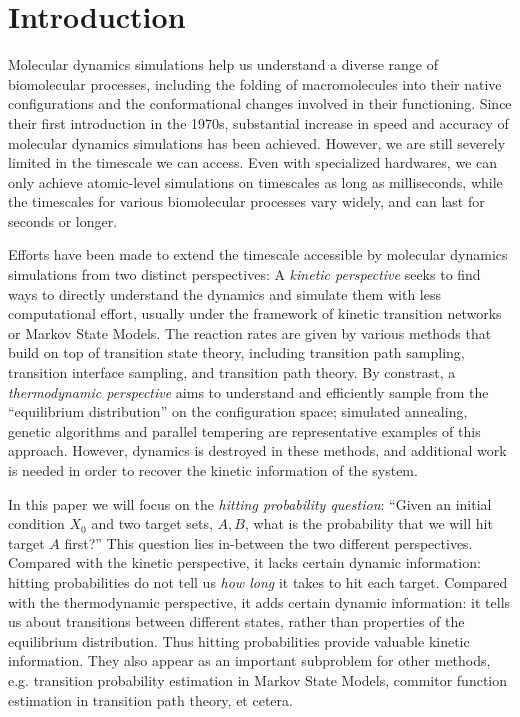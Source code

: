 \documentclass[english, aip, jcp, priprint, graphicx,floatfix]{revtex4-1}
\theoremstyle{plain}
\theoremstyle{definition}
\theoremstyle{plain}
\begin{document}
\section{Introduction}

Molecular dynamics simulations help us understand a diverse range of biomolecular processes, including the folding of macromolecules into their native configurations\cite{Scheraga2007-qw} and the conformational changes involved in their functioning.\cite{Hospital2015-ol} Since their first introduction in the 1970s,\cite{McCammon1977-kg, Warshel1976-qg} substantial increase in speed and accuracy of molecular dynamics simulations has been achieved. However, we are still severely limited in the timescale we can access. Even with specialized hardwares, we can only achieve atomic-level simulations on timescales as long as milliseconds,\cite{Dror2012-ws} while the timescales for various biomolecular processes vary widely, and can last for seconds or longer.\cite{Naganathan2005-ki, Zemora2010-lb} 

Efforts have been made to extend the timescale accessible by molecular dynamics simulations from two distinct perspectives: A \emph{kinetic perspective} seeks to find ways to directly understand the dynamics and simulate them with less computational effort, usually under the framework of kinetic transition networks\cite{Noe2006-cs, Wales2006-ur} or Markov State Models\cite{Pande2010-yi, Chodera2014-bh, Husic2018-xp}. The reaction rates are given by various methods that build on top of transition state theory\cite{Eyring1935-ur, Chandler1978-bq, Wigner1997-kk}, including transition path sampling\cite{Dellago1998-lb, Bolhuis2002-ws}, transition interface sampling\cite{Van_Erp2005-vw}, and transition path theory\cite{E2006-fm, E2010-sr}. By constrast, a \emph{thermodynamic perspective} aims to understand and efficiently sample from the ``equilibrium distribution'' on the configuration space; simulated annealing,\cite{Kirkpatrick1983-su} genetic algorithms\cite{Goldberg1989-ko} and parallel tempering\cite{Sugita1999-vh} are representative examples of this approach. However, dynamics is destroyed in these methods, and additional work\cite{Yang2007-gn, Andrec2005-fh, Zheng2009-ow, Huang2010-uu} is needed in order to recover the kinetic information of the system.

In this paper we will focus on the \emph{hitting probability question}: ``Given an initial condition $X_0$ and two target sets, $A,B$, what is the probability that we will hit target $A$ first?'' This question lies in-between the two different perspectives. Compared with the kinetic perspective, it lacks certain dynamic information: hitting probabilities do not tell us \emph{how long} it takes to hit each target.  Compared with the thermodynamic perspective, it adds certain dynamic information: it tells us about transitions between different states, rather than properties of the equilibrium distribution. Thus hitting probabilities provide valuable kinetic information.  They also appear as an important subproblem for other methods, e.g. transition probability estimation in Markov State Models, commitor function estimation in transition path theory, et cetera.
\end{document}
